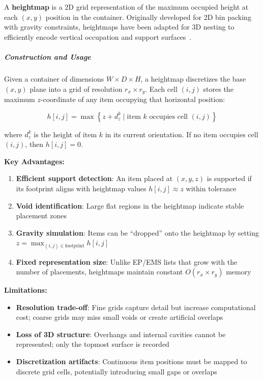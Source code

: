 A \textbf{heightmap} is a 2D grid representation of the maximum occupied height at each $(x, y)$ position in the container. Originally developed for 2D bin packing with gravity constraints, heightmaps have been adapted for 3D nesting to efficiently encode vertical occupation and support surfaces~\cite{ARCO22}.

\subparagraph{Construction and Usage}

Given a container of dimensions $W \times D \times H$, a heightmap discretizes the base $(x, y)$ plane into a grid of resolution $r_x \times r_y$. Each cell $(i, j)$ stores the maximum $z$-coordinate of any item occupying that horizontal position:

\begin{equation}
h[i, j] = \max\left\{z + d_z^k \mid \text{item } k \text{ occupies cell } (i, j)\right\}
\end{equation}

where $d_z^k$ is the height of item $k$ in its current orientation. If no item occupies cell $(i, j)$, then $h[i, j] = 0$.

\textbf{Key Advantages:}

\begin{enumerate}
    \item \textbf{Efficient support detection}: An item placed at $(x, y, z)$ is supported if its footprint aligns with heightmap values $h[i, j] \approx z$ within tolerance
    \item \textbf{Void identification}: Large flat regions in the heightmap indicate stable placement zones
    \item \textbf{Gravity simulation}: Items can be ``dropped'' onto the heightmap by setting $z = \max_{(i,j) \in \text{footprint}} h[i, j]$
    \item \textbf{Fixed representation size}: Unlike EP/EMS lists that grow with the number of placements, heightmaps maintain constant $O(r_x \times r_y)$ memory
\end{enumerate}

\textbf{Limitations:}

\begin{itemize}
    \item \textbf{Resolution trade-off}: Fine grids capture detail but increase computational cost; coarse grids may miss small voids or create artificial overlaps
    \item \textbf{Loss of 3D structure}: Overhangs and internal cavities cannot be represented; only the topmost surface is recorded
    \item \textbf{Discretization artifacts}: Continuous item positions must be mapped to discrete grid cells, potentially introducing small gaps or overlaps
\end{itemize}

